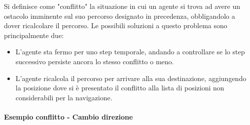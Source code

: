 \documentclass[12pt]{article}
\begin{document}
\noindent Si definisce come "conflitto" la situazione in cui un agente si trova ad avere un ostacolo imminente sul suo percorso designato in precedenza, obbligandolo a dover ricalcolare il percorso. Le possibili soluzioni a questo problema sono principalmente due:\\
\begin{itemize}
\item L'agente sta fermo per uno step temporale, andando a controllare se lo step successivo persiste ancora lo stesso conflitto o meno.
\item L'agente ricalcola il percorso per arrivare alla sua destinazione, aggiungendo la posizione dove si è presentato il conflitto alla lista di posizioni non considerabili per la navigazione.
\end{itemize}

\newpage

\paragraph{Esempio conflitto - Cambio direzione}
\vspace{0.2cm}
\end{document}

